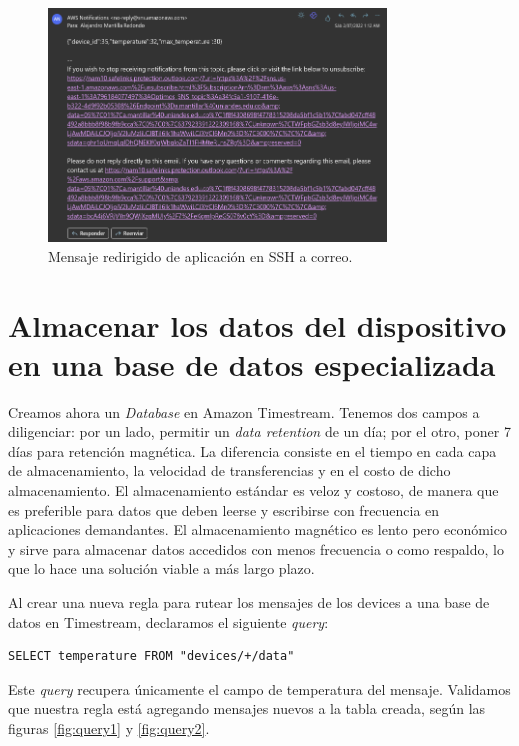 \documentclass[10pt]{article}
\begin{document}
\begin{figure}[H]
    \centering
    \includegraphics[width=0.8\textwidth]{Images/Mensaje_redirigido_de_SSH_a_SNS.png}
    \caption{Mensaje redirigido de aplicación en SSH a correo.}
    \label{fig:mensaje_redirigido_de_SSH_a_correo}
\end{figure}




\section{Almacenar los datos del dispositivo en una base de datos especializada}

Creamos ahora un \textit{Database} en Amazon Timestream. Tenemos dos campos a diligenciar: por un lado, permitir un \textit{data retention} de un día; por el otro, poner 7 días para retención magnética. La diferencia consiste en el tiempo en cada capa de almacenamiento, la velocidad de transferencias y en el costo de dicho almacenamiento. El almacenamiento estándar es veloz y costoso, de manera que es preferible para datos que deben leerse y escribirse con frecuencia en aplicaciones demandantes. El almacenamiento magnético es lento pero económico y sirve para almacenar datos accedidos con menos frecuencia o como respaldo, lo que lo hace una solución viable a más largo plazo.

Al crear una nueva regla para rutear los mensajes de los devices a una base de datos en Timestream, declaramos el siguiente \textit{query}:

\begin{lstlisting}
SELECT temperature FROM "devices/+/data"
\end{lstlisting}

Este \textit{query} recupera únicamente el campo de temperatura del mensaje. Validamos que nuestra regla está agregando mensajes nuevos a la tabla creada, según las figuras \ref{fig:query1} y \ref{fig:query2}.
\end{document}
